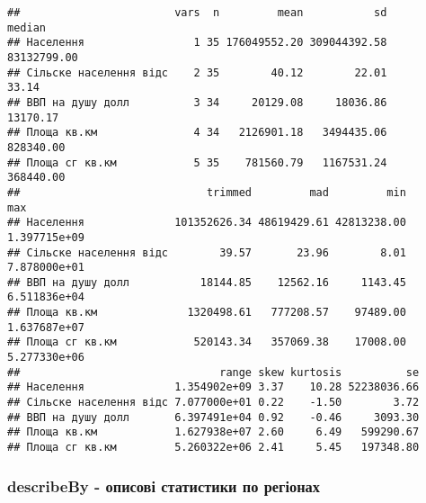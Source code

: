 \documentclass[
]{article}
\newenvironment{Shaded}{\begin{snugshade}}{\end{snugshade}}
\newcommand{\CommentTok}[1]{\textcolor[rgb]{0.56,0.35,0.01}{\textit{#1}}}
\newcommand{\DataTypeTok}[1]{\textcolor[rgb]{0.13,0.29,0.53}{#1}}
\newcommand{\KeywordTok}[1]{\textcolor[rgb]{0.13,0.29,0.53}{\textbf{#1}}}
\newcommand{\NormalTok}[1]{#1}
\newcommand{\OperatorTok}[1]{\textcolor[rgb]{0.81,0.36,0.00}{\textbf{#1}}}
\newcommand{\OtherTok}[1]{\textcolor[rgb]{0.56,0.35,0.01}{#1}}
\newcommand{\StringTok}[1]{\textcolor[rgb]{0.31,0.60,0.02}{#1}}
\begin{document}
\begin{Shaded}
\end{Shaded}

\begin{verbatim}
##                        vars  n         mean           sd      median
## Населення                 1 35 176049552.20 309044392.58 83132799.00
## Сільске населення відс    2 35        40.12        22.01       33.14
## ВВП на душу долл          3 34     20129.08     18036.86    13170.17
## Площа кв.км               4 34   2126901.18   3494435.06   828340.00
## Площа сг кв.км            5 35    781560.79   1167531.24   368440.00
##                             trimmed         mad         min          max
## Населення              101352626.34 48619429.61 42813238.00 1.397715e+09
## Сільске населення відс        39.57       23.96        8.01 7.878000e+01
## ВВП на душу долл           18144.85    12562.16     1143.45 6.511836e+04
## Площа кв.км              1320498.61   777208.57    97489.00 1.637687e+07
## Площа сг кв.км            520143.34   357069.38    17008.00 5.277330e+06
##                               range skew kurtosis          se
## Населення              1.354902e+09 3.37    10.28 52238036.66
## Сільске населення відс 7.077000e+01 0.22    -1.50        3.72
## ВВП на душу долл       6.397491e+04 0.92    -0.46     3093.30
## Площа кв.км            1.627938e+07 2.60     6.49   599290.67
## Площа сг кв.км         5.260322e+06 2.41     5.45   197348.80
\end{verbatim}

\hypertarget{describeby---ux43eux43fux438ux441ux43eux432ux456-ux441ux442ux430ux442ux438ux441ux442ux438ux43aux438-ux43fux43e-ux440ux435ux433ux456ux43eux43dux430ux445}{%
\subsubsection{describeBy - описові статистики по
регіонах}\label{describeby---ux43eux43fux438ux441ux43eux432ux456-ux441ux442ux430ux442ux438ux441ux442ux438ux43aux438-ux43fux43e-ux440ux435ux433ux456ux43eux43dux430ux445}}
\end{document}

